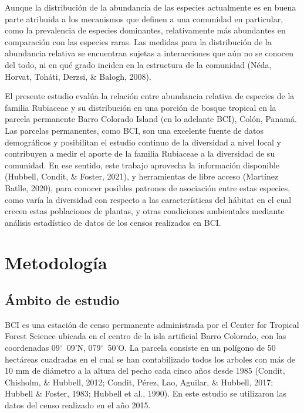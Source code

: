 \documentclass[11pt,]{article}
\begin{document}
Aunque la distribución de la abundancia de las especies actualmente es
en buena parte atribuida a los mecanismos que definen a una comunidad en
particular, como la prevalencia de especies dominantes, relativamente
más abundantes en comparación con las especies raras. Las medidas para
la distribución de la abundancia relativa se encuentran sujetas a
interacciones que aún no se conocen del todo, ni en qué grado inciden en
la estructura de la comunidad (Néda, Horvat, Toháti, Derzsi, \& Balogh,
2008).

El presente estudio evalúa la relación entre abundancia relativa de
especies de la familia Rubiaceae y su distribución en una porción de
bosque tropical en la parcela permanente Barro Colorado Island (en lo
adelante BCI), Colón, Panamá. Las parcelas permanentes, como BCI, son
una excelente fuente de datos demográficos y posibilitan el estudio
continuo de la diversidad a nivel local y contribuyen a medir el aporte
de la familia Rubiaceae a la diversidad de su comunidad. En ese sentido,
este trabajo aprovecha la información disponible (Hubbell, Condit, \&
Foster, 2021), y herramientas de libre acceso (Martínez Batlle, 2020),
para conocer posibles patrones de asociación entre estas especies, como
varía la diversidad con respecto a las características del hábitat en el
cual crecen estas poblaciones de plantas, y otras condiciones
ambientales mediante análisis estadístico de datos de los censos
realizados en BCI.

\section{Metodología}\label{metodologuxeda}

\subsection{Ámbito de estudio}\label{uxe1mbito-de-estudio}

BCI es una estación de censo permanente administrada por el Center for
Tropical Forest Science ubicada en el centro de la isla artificial Barro
Colorado, con las coordenadas 09\(^\circ\)~09'N, 079\(^\circ\)~50'O. La
parcela consiste en un polígono de 50 hectáreas cuadradas en el cual se
han contabilizado todos los arboles con más de 10 mm de diámetro a la
altura del pecho cada cinco años desde 1985 (Condit, Chisholm, \&
Hubbell, 2012; Condit, Pérez, Lao, Aguilar, \& Hubbell, 2017; Hubbell \&
Foster, 1983; Hubbell et al., 1990). En este estudio se utilizaron las
datos del censo realizado en el año 2015.
\end{document}
